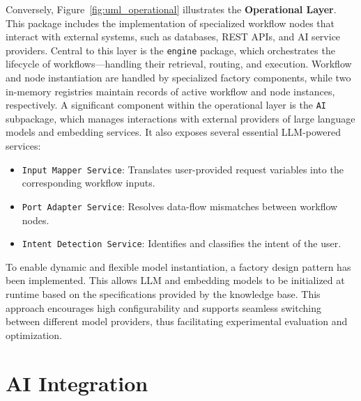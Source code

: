 Conversely, Figure~\ref{fig:uml_operational} illustrates the \textbf{Operational Layer}. This package includes the implementation of specialized workflow nodes that interact with external systems, such as databases, REST APIs, and AI service providers. Central to this layer is the \texttt{engine} package, which orchestrates the lifecycle of workflows—handling their retrieval, routing, and execution. Workflow and node instantiation are handled by specialized factory components, while two in-memory registries maintain records of active workflow and node instances, respectively. A significant component within the operational layer is the \texttt{AI} subpackage, which manages interactions with external providers of large language models and embedding services. It also exposes several essential LLM-powered services:

\begin{itemize}[leftmargin=*, label=--]
    \item \texttt{Input Mapper Service}: Translates user-provided request variables into the corresponding workflow inputs.
    
    \item \texttt{Port Adapter Service}: Resolves data-flow mismatches between workflow nodes.
    
    \item \texttt{Intent Detection Service}: Identifies and classifies the intent of the user.
\end{itemize}


\noindent
To enable dynamic and flexible model instantiation, a factory design pattern has been implemented. This allows LLM and embedding models to be initialized at runtime based on the specifications provided by the knowledge base. This approach encourages high configurability and supports seamless switching between different model providers, thus facilitating experimental evaluation and optimization.









\section*{AI Integration}

